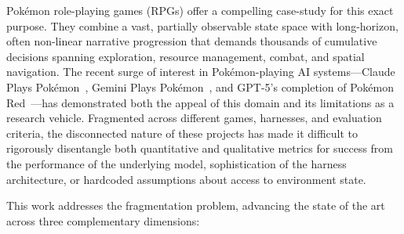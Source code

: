 Pok\'{e}mon role-playing games (RPGs) offer a compelling case-study for this exact purpose. They combine a vast, partially observable state space with long-horizon, often non-linear narrative progression that demands thousands of cumulative decisions spanning exploration, resource management, combat, and spatial navigation. The recent surge of interest in Pok\'{e}mon-playing AI systems---Claude Plays Pok\'{e}mon~\citep{anthropic2025visible}, Gemini Plays Pok\'{e}mon~\citep{zhang2025geminiplayspokemon}, and GPT-5's completion of Pok\'{e}mon Red~\citep{engadget2025gptplayspokemon}---has demonstrated both the appeal of this domain and its limitations as a research vehicle. Fragmented across different games, harnesses, and evaluation criteria, the disconnected nature of these projects has made it difficult to rigorously disentangle both quantitative and qualitative metrics for success from the performance of the underlying model, sophistication of the harness architecture, or hardcoded assumptions about access to environment state.

This work addresses the fragmentation problem, advancing the state of the art across three complementary dimensions:

